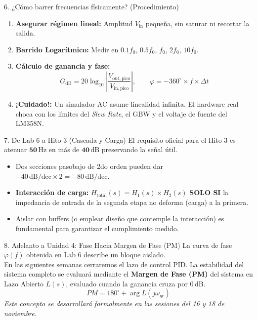 \documentclass[aspectratio=169, 10pt]{beamer}
\begin{document}
\begin{frame}{6. ¿Cómo barrer frecuencias físicamente? (Procedimiento)}
    \begin{enumerate}
        \item \textbf{Asegurar régimen lineal:} Amplitud $V_{\mathrm{in}}$ pequeña, sin saturar ni recortar la salida.
        \item \textbf{Barrido Logarítmico:} Medir en $0.1f_0$, $0.5f_0$, $f_0$, $2f_0$, $10f_0$.
        \item \textbf{Cálculo de ganancia y fase:}
        \begin{equation*}
            G_{\mathrm{dB}} = 20\log_{10}\left|\frac{V_{\mathrm{out,pico}}}{V_{\mathrm{in,pico}}}\right|, \qquad \varphi = -360^\circ \times f \times \Delta t
        \end{equation*}
        \item \textbf{¡Cuidado!:} Un simulador AC asume linealidad infinita. El hardware real choca con los límites del \textit{Slew Rate}, el GBW y el voltaje de fuente del LM358N.
    \end{enumerate}
\end{frame}

\begin{frame}{7. De Lab 6 a Hito 3 (Cascada y Carga)}
    El requisito oficial para el Hito 3 es atenuar $\mathbf{50\,\mathrm{Hz}}$ en más de $\mathbf{40\,\mathrm{dB}}$ preservando la señal útil.
    \begin{itemize}
        \item Dos secciones pasobajo de 2do orden pueden dar $-40\,\mathrm{dB/dec} \times 2 = -80\,\mathrm{dB/dec}$.
        \item \textbf{Interacción de carga:} $H_{\mathrm{total}}(s) = H_1(s) \times H_2(s)$ \textbf{SOLO SI} la impedancia de entrada de la segunda etapa no deforma (carga) a la primera.
        \item Aislar con buffers (o emplear diseño que contemple la interacción) es fundamental para garantizar el cumplimiento medido.
    \end{itemize}
\end{frame}

\begin{frame}{8. Adelanto a Unidad 4: Fase Hacia Margen de Fase (PM)}
    La curva de fase $\varphi(f)$ obtenida en Lab 6 describe un bloque aislado.\\
    \vspace{0.5cm}
    En las siguientes semanas cerraremos el lazo de control PID. La estabilidad del sistema completo se evaluará mediante el \textbf{Margen de Fase (PM)} del sistema en Lazo Abierto $L(s)$, evaluado cuando la ganancia cruza por $0\,\mathrm{dB}$.
    \begin{equation*}
        PM = 180^\circ + \arg L(j\omega_{gc})
    \end{equation*}
    \textit{Este concepto se desarrollará formalmente en las sesiones del 16 y 18 de noviembre.}
\end{frame}
\end{document}
